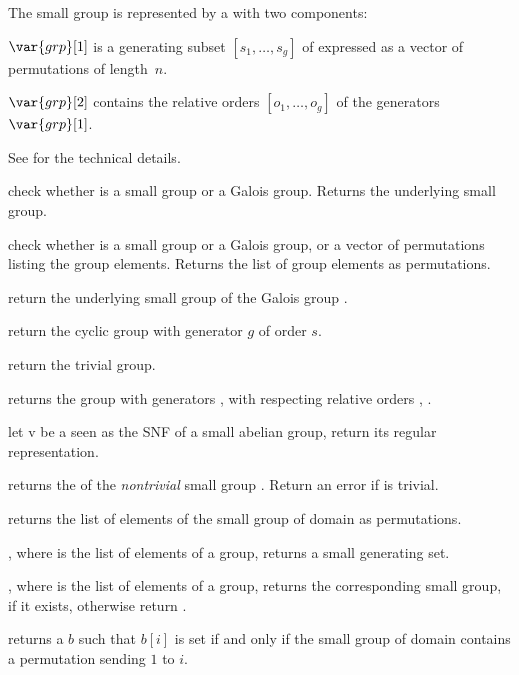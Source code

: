 The small group  is represented by a  with two
components:

$\var{grp}[1]$ is a generating subset $[s_1,\ldots,s_g]$ of 
expressed as a vector of permutations of length~$n$.

$\var{grp}[2]$ contains the relative orders $[o_1,\ldots,o_g]$ of
the generators $\var{grp}[1]$.

See  for the technical details.

 check whether  is a
small group or a Galois group. Returns the underlying small
group.

check whether  is a small group or a Galois group, or a vector of
permutations listing the group elements. Returns the list of group elements as
permutations.

 return the underlying small group of the
Galois group .

 return the cyclic group with generator
$g$ of order $s$.

 return the trivial group.

 returns the group
with generators ,  with respecting relative orders ,
.

 let v be a  seen as the SNF of
a small abelian group, return its regular representation.

 returns the  of the
\emph{nontrivial} small group . Return an error if  is
trivial.

 returns the list of elements of the
small group  of domain  as permutations.

, where  is the list of
elements of a group, returns a small generating set.

, where  is the list of
elements of a group, returns the corresponding small group, if it
exists, otherwise return .

 returns a  $b$ such that
$b[i]$ is set if and only if the small group  of domain 
contains a permutation sending $1$ to $i$.

